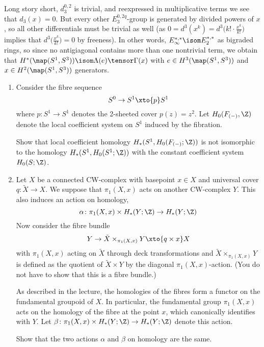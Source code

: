 \begin{solution}
	Long story short, $d_3^{0, 2}$ is trivial, and reexpressed in multiplicative terms we see that $d_3(x) = 0$.
	But every other $E_3^{0, 2q}$-group is generated by divided powers of $x$, so all other differentials must be trivial as well (as $0 = d^3(x^k) = d^3\big(k! \cdot \frac{x^k}{k!}\big)$ implies that $d^3\big(\frac{x^k}{k!}\big) = 0$ by freeness).
	In other words, $E_\infty^{*, *} \isom E_2^{*, *}$ as bigraded rings, so since no antigiagonal contains more than one nontrivial term, we obtain that $H^*(\map(S^1, S^3)) \isom \Lambda(e) \tensor \Gamma(x)$ with $e \in H^3(\map(S^1, S^3))$ and $x \in H^2(\map(S^1, S^3))$ generators.
\end{solution}

\begin{exercise}
	\leavevmode
	\begin{enumerate}
		\item Consider the fibre sequence
			\begin{equation*}
				S^0 \to S^1 \xto{p} S^1
			\end{equation*}
			where $p\colon S^1 \to S^1$ denotes the 2-sheeted cover $p(z) = z^2$.
			Let $H_0(F_{({{-}})}, \Z)$ denote the local coefficient system on $S^1$ induced by the fibration.

			Show that local coefficient homology $H_*(S^1, H_0(F_{({{-}})}; \Z))$ is not isomorphic to the homology $H_*(S^1, H_0(S^1; \Z))$ with the constant coefficient system $H_0(S; \Z)$.
		\item Let $X$ be a connected CW-complex with basepoint $x \in X$ and universal cover $q\colon \tilde{X} \to X$.
			We suppose that $\pi_1(X, x)$ acts on another CW-complex $Y$.
			This also induces an action on homology,
			\begin{equation*}
				\alpha\colon \pi_1(X, x) \times H_*(Y; \Z) \to H_*(Y; \Z)
			\end{equation*}
			Now consider the fibre bundle
			\begin{equation*}
				Y \to \tilde{X} \times_{\pi_1(X, x)} Y \xto{q \times x} X
			\end{equation*}
			with $\pi_1(X, x)$ acting on $\tilde{X}$ through deck transformations and $\tilde{X} \times_{\pi_1(X, x)} Y$ is defined as the quotient of $\tilde{X} \times Y$ by the diagonal $\pi_1(X, x)$-action. 
			(You do not have to show that this is a fibre bundle.)

			As described in the lecture, the homologies of the fibres form a functor on the fundamental groupoid of $X$.
			In particular, the fundamental group $\pi_1(X, x)$ acts on the homology of the fibre at the point $x$, which canonically identifies with $Y$.
			Let $\beta\colon \pi_1(X, x) \times H_*(Y; \Z) \to H_*(Y; \Z)$ denote this action.

			Show that the two actions $\alpha$ and $\beta$ on homology are the same.
	\end{enumerate}
\end{exercise}

